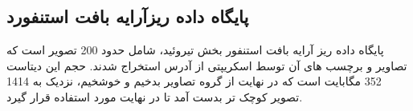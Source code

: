 \subsection{پایگاه داده ریزآرایه بافت استنفورد}\label{subsec:پایگاه-داده-ریزآرایه-بافت-استنفورد}
پایگاه داده ریز آرایه بافت استنفور\cite{marinelli2007stanford} بخش تیروئید، شامل حدود 200 تصویر است که تصاویر و برچسب های آن توسط اسکریپتی از آدرس \cite{stanfortissuemicroarray} استخراج شدند. حجم این دیتاست 352 مگابایت است که در نهایت از گروه تصاویر بدخیم و خوشخیم، نزدیک به 1414 تصویر کوچک تر بدست آمد تا در نهایت مورد استفاده قرار گیرد.

